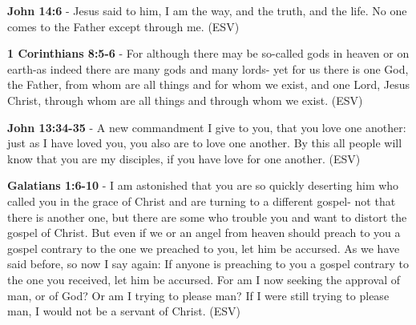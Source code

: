 \documentclass[11pt]{article}
\begin{document}
\textbf{John 14:6} - Jesus said to him, I am the way, and the truth, and the life. No one comes to the Father except through me. (ESV)

\textbf{1 Corinthians 8:5-6} - For although there may be so-called gods in heaven or on earth-as indeed there are many gods and many lords- yet for us there is one God, the Father, from whom are all things and for whom we exist, and one Lord, Jesus Christ, through whom are all things and through whom we exist. (ESV)

\textbf{John 13:34-35} - A new commandment I give to you, that you love one another: just as I have loved you, you also are to love one another. By this all people will know that you are my disciples, if you have love for one another. (ESV)

\textbf{Galatians 1:6-10} - I am astonished that you are so quickly deserting him who called you in the grace of Christ and are turning to a different gospel- not that there is another one, but there are some who trouble you and want to distort the gospel of Christ. But even if we or an angel from heaven should preach to you a gospel contrary to the one we preached to you, let him be accursed. As we have said before, so now I say again: If anyone is preaching to you a gospel contrary to the one you received, let him be accursed. For am I now seeking the approval of man, or of God? Or am I trying to please man? If I were still trying to please man, I would not be a servant of Christ. (ESV)
\end{document}
